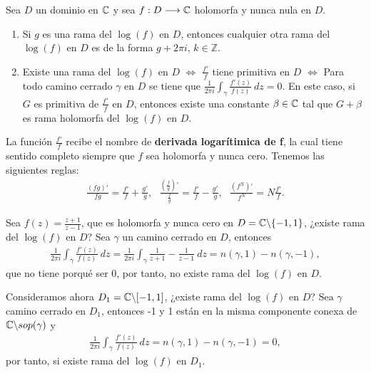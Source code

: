 \begin{teo}[Recopilatorio]
    Sea $D$ un dominio en $\mathbb{C}$ y sea $f: D \longrightarrow \mathbb{C}$ holomorfa y nunca nula en $D$.
    \begin{enumerate}
        \item Si $g$ es una rama del $\log(f)$ en $D$, entonces cualquier otra rama del $\log(f)$ en $D$ es de la forma $g + 2\pi i$, $k \in \mathbb{Z}$.
        \item Existe una rama del $\log(f)$ en $D$ $\Longleftrightarrow$ $\frac{f'}{f}$ tiene primitiva en $D$ $\Longleftrightarrow$ Para todo camino cerrado $\gamma$ en $D$ se tiene que $\frac{1}{2\pi i}\int_{\gamma} \frac{f'(z)}{f(z)} \ dz = 0$. En este caso, si $G$ es primitiva de $\frac{f'}{f}$ en $D$, entonces existe una constante $\beta \in \mathbb{C}$ tal que $G + \beta$ es rama holomorfa del $\log(f)$ en $D$.
    \end{enumerate}
\end{teo}

\begin{obs}
    La función $\frac{f'}{f}$ recibe el nombre de \textbf{derivada logarítimica de f}, la cual tiene sentido completo siempre que $f$ sea holomorfa y nunca cero. Tenemos las siguientes reglas:
    \begin{align*}
        \frac{(fg)'}{fg} = \frac{f'}{f} + \frac{g'}{g}, \ \ \ \frac{\left(  \frac{f}{g}\right)'}{\frac{f}{g}} = \frac{f'}{f} - \frac{g'}{g}, \ \ \ \frac{(f^N)'}{f^N} = N \frac{f'}{f}.
    \end{align*}
\end{obs}

\begin{ejemplo}
    Sea $f(z) = \frac{z+1}{z-1}$, que es holomorfa y nunca cero en $D = \mathbb{C} \backslash \{-1,1\}$, ¿existe rama del $\log(f)$ en $D$? Sea $\gamma$ un camino cerrado en $D$, entonces
    \begin{align*}
        \frac{1}{2\pi i} \int_{\gamma} \frac{f'(z)}{f(z)} \ dz = \frac{1}{2\pi i} \int_{\gamma} \frac{1}{z+1} - \frac{1}{z-1} \ dz = n(\gamma,1) - n(\gamma,-1),
    \end{align*}
    que no tiene porqué ser 0, por tanto, no existe rama del $\log(f)$ en $D$.

    Consideramos ahora $D_1 = \mathbb{C} \backslash [-1,1]$, ¿existe rama del $\log(f)$ en $D$? Sea $\gamma$ camino cerrado en $D_1$, entonces -1 y 1 están en la misma componente conexa de $\mathbb{C} \backslash sop(\gamma)$ y
    \begin{align*}
        \frac{1}{2\pi i} \int_{\gamma} \frac{f'(z)}{f(z)} \ dz = n(\gamma,1) - n(\gamma,-1) = 0,
    \end{align*}
    por tanto, si existe rama del $\log(f)$ en $D_1$.
\end{ejemplo}

